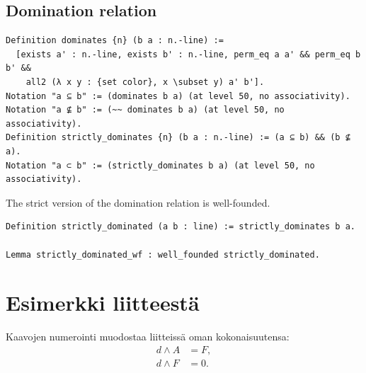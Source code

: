 \documentclass[english, 12pt, a4paper, sci, a-1b, online]{aaltothesis}
\begin{document}
\subsection{Domination relation}

\begin{verbatim}
Definition dominates {n} (b a : n.-line) :=
  [exists a' : n.-line, exists b' : n.-line, perm_eq a a' && perm_eq b b' &&
    all2 (λ x y : {set color}, x \subset y) a' b'].
Notation "a ⊆ b" := (dominates b a) (at level 50, no associativity).
Notation "a ⊈ b" := (~~ dominates b a) (at level 50, no associativity).
Definition strictly_dominates {n} (b a : n.-line) := (a ⊆ b) && (b ⊈ a).
Notation "a ⊂ b" := (strictly_dominates b a) (at level 50, no associativity).
\end{verbatim}

The strict version of the domination relation is well-founded.

\begin{verbatim}
Definition strictly_dominated (a b : line) := strictly_dominates b a.

Lemma strictly_dominated_wf : well_founded strictly_dominated.
\end{verbatim}

\clearpage
\thesisbibliography{}




\clearpage
\thesisappendix{}

\section{Esimerkki liitteestä\label{LiiteA}}

Kaavojen numerointi muodostaa liitteissä oman kokonaisuutensa:
\begin{align}
d \wedge A &= F, \label{liitekaava1}\\
d \wedge F &= 0. \label{liitekaava2}
\end{align}
\end{document}
